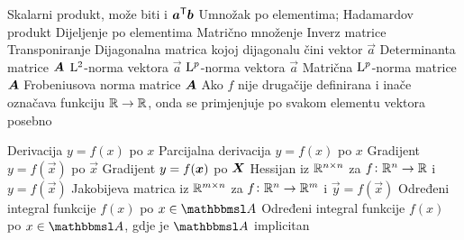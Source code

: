  {} 
	{Skalarni produkt, može biti i $\vec{a}^\tp\vec{b}$}
	{Umnožak po elementima; Hadamardov produkt}
	{Dijeljenje po elementima}
	{Matrično množenje}
	{Inverz matrice}
	{Transponiranje}
	{Dijagonalna matrica kojoj dijagonalu čini vektor $\vec a$}
	{Determinanta matrice $\mat A$}
	{$\mathrm{L}^2$-norma vektora $\vec a$}
	{$\mathrm{L}^p$-norma vektora $\vec a$}
	{Matrična $\mathrm{L}^p$-norma matrice $\mat A$}
	{Frobeniusova norma matrice $\mat A$}
	{Ako $f$ nije drugačije definirana i inače označava funkciju $\mathbb{R}\to\mathbb{R}$, onda se primjenjuje po svakom elementu vektora posebno}

	{Derivacija $y=f(x)$ po $x$}
	{Parcijalna derivacija $y=f(x)$ po $x$}
	{Gradijent $y=f(\vec x)$ po $\vec x$}
	{Gradijent $y=f(\mat x)$ po $\mat X$}
	{Hessijan iz $\mathbb{R}^{n\times n}$ za $f \colon \mathbb{R}^n \to \mathbb{R}$ i $y=f(\vec x)$}
	{Jakobijeva matrica iz $\mathbb{R}^{m\times n}$ za $f \colon \mathbb{R}^n \to \mathbb{R}^m$ i $\vec y=f(\vec x)$}
	{Određeni integral funkcije $f(x)$ po $x\in\set A$}
	{Određeni integral funkcije $f(x)$ po $x\in\set A$, gdje je $\set A$ implicitan}

